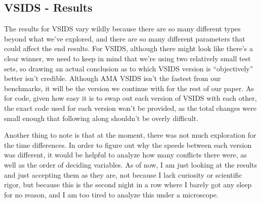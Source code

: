 \documentclass[oneside]{book}
\begin{document}
\subsection{VSIDS - Results}
The results for VSIDS vary wildly because there are so many different types beyond what 
we've explored, and there are so many different parameters that could affect the end 
results. For VSIDS, although there might look like there's a clear winner, we need to 
keep in mind that we're using two relatively small test sets, so drawing an actual
conclusion as to which VSIDS version is ``objectively'' better isn't credible. 
Although AMA VSIDS isn't the fastest from our benchmarks, it will be the version we 
continue with for the rest of our paper. As for code, given how easy it is to swap out 
each version of VSIDS with each other, the exact code used for each version won't be 
provided, as the total changes were small enough that following along shouldn't be overly
difficult.

Another thing to note is that at the moment, there was not much exploration for the 
time differences. In order to figure out why the speeds between each version was 
different, it would be helpful to analyze how many conflicts there were, as well as the
order of deciding variables. As of now, I am just looking at the results and just 
accepting them as they are, not because I lack curiosity or scientific rigor, but because 
this is the second night in a row where I barely got any sleep for no reason, and I 
am too tired to analyze this under a microscope.
\end{document}

